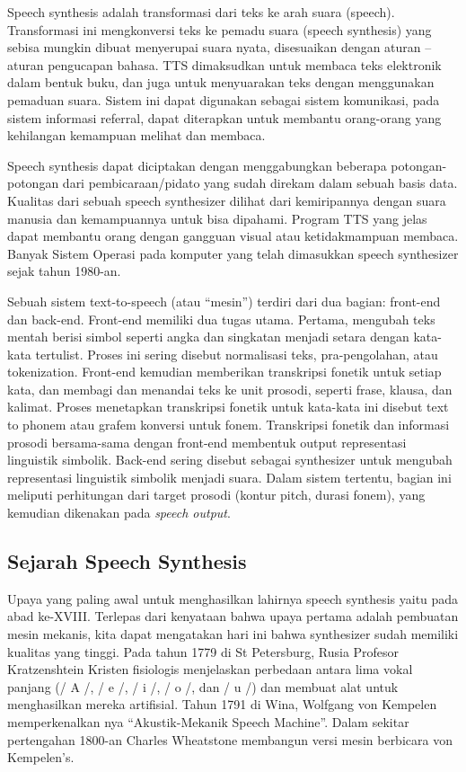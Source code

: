 Speech synthesis adalah transformasi dari teks ke arah suara (speech). Transformasi ini mengkonversi teks ke pemadu suara (speech synthesis) yang sebisa mungkin dibuat menyerupai suara nyata, disesuaikan dengan aturan – aturan pengucapan bahasa. TTS dimaksudkan untuk membaca teks elektronik dalam bentuk buku, dan juga untuk menyuarakan teks dengan menggunakan pemaduan suara. Sistem ini dapat digunakan sebagai sistem komunikasi, pada sistem informasi referral, dapat diterapkan untuk membantu orang-orang yang kehilangan kemampuan melihat dan membaca.

Speech synthesis dapat diciptakan dengan menggabungkan beberapa potongan-potongan dari pembicaraan/pidato yang sudah direkam dalam sebuah basis data. Kualitas dari sebuah speech synthesizer dilihat dari kemiripannya dengan suara manusia dan kemampuannya untuk bisa dipahami. Program TTS yang jelas dapat membantu orang dengan gangguan visual atau ketidakmampuan membaca. Banyak Sistem Operasi pada komputer yang telah dimasukkan speech synthesizer sejak tahun 1980-an.

Sebuah sistem text-to-speech (atau “mesin”) terdiri dari dua bagian: front-end dan back-end. Front-end memiliki dua tugas utama. Pertama, mengubah teks mentah berisi simbol seperti angka dan singkatan menjadi setara dengan kata-kata tertulist. Proses ini sering disebut normalisasi teks, pra-pengolahan, atau tokenization. Front-end kemudian memberikan transkripsi fonetik untuk setiap kata, dan membagi dan menandai teks ke unit prosodi, seperti frase, klausa, dan kalimat. Proses menetapkan transkripsi fonetik untuk kata-kata ini disebut text to phonem atau grafem konversi untuk fonem. Transkripsi fonetik dan informasi prosodi bersama-sama dengan front-end membentuk output representasi linguistik simbolik. Back-end sering disebut sebagai synthesizer untuk mengubah representasi linguistik simbolik menjadi suara. Dalam sistem tertentu, bagian ini meliputi perhitungan dari target prosodi (kontur pitch, durasi fonem), yang kemudian dikenakan pada \textit{speech output}.

\subsection{Sejarah Speech Synthesis}
Upaya yang paling awal untuk menghasilkan lahirnya speech synthesis yaitu pada abad ke-XVIII. Terlepas dari kenyataan bahwa upaya pertama adalah pembuatan mesin mekanis, kita dapat mengatakan hari ini  bahwa synthesizer sudah memiliki kualitas yang tinggi. Pada tahun 1779 di St Petersburg, Rusia Profesor Kratzenshtein Kristen fisiologis menjelaskan perbedaan antara lima vokal panjang  (/ A /, / e /, / i /, / o /, dan / u /) dan membuat alat untuk menghasilkan mereka artifisial. Tahun 1791 di Wina, Wolfgang von Kempelen memperkenalkan nya “Akustik-Mekanik Speech Machine”. Dalam sekitar pertengahan 1800-an Charles Wheatstone membangun versi mesin berbicara von Kempelen’s.

